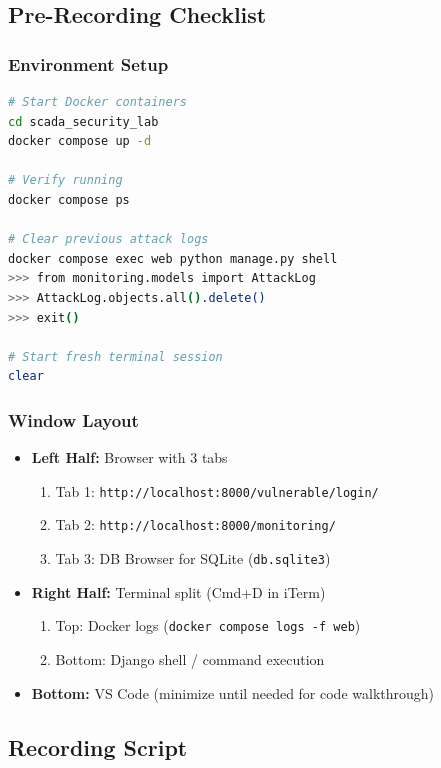 \documentclass[12pt,a4paper]{article}
\begin{document}
\subsection{Pre-Recording Checklist}

\subsubsection{Environment Setup}
\begin{lstlisting}[language=bash]
# Start Docker containers
cd scada_security_lab
docker compose up -d

# Verify running
docker compose ps

# Clear previous attack logs
docker compose exec web python manage.py shell
>>> from monitoring.models import AttackLog
>>> AttackLog.objects.all().delete()
>>> exit()

# Start fresh terminal session
clear
\end{lstlisting}

\subsubsection{Window Layout}
\begin{itemize}[leftmargin=*]
    \item \textbf{Left Half:} Browser with 3 tabs
    \begin{enumerate}
        \item Tab 1: \texttt{http://localhost:8000/vulnerable/login/}
        \item Tab 2: \texttt{http://localhost:8000/monitoring/}
        \item Tab 3: DB Browser for SQLite (\texttt{db.sqlite3})
    \end{enumerate}
    \item \textbf{Right Half:} Terminal split (Cmd+D in iTerm)
    \begin{enumerate}
        \item Top: Docker logs (\texttt{docker compose logs -f web})
        \item Bottom: Django shell / command execution
    \end{enumerate}
    \item \textbf{Bottom:} VS Code (minimize until needed for code walkthrough)
\end{itemize}

\subsection{Recording Script}
\end{document}
